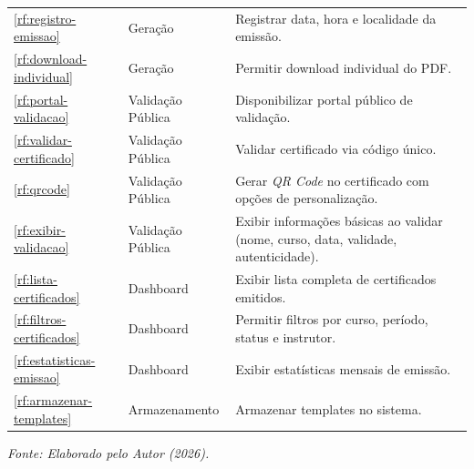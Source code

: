 \begin{longtable}{p{1.2cm} p{3.5cm} p{10.5cm}}
\ref{rf:registro-emissao} & Geração & Registrar data, hora e localidade da emissão. \\
\ref{rf:download-individual} & Geração & Permitir download individual do PDF. \\
\midrule
\ref{rf:portal-validacao} & Validação Pública & Disponibilizar portal público de validação. \\
\ref{rf:validar-certificado} & Validação Pública & Validar certificado via código único. \\
\ref{rf:qrcode} & Validação Pública & Gerar \textit{QR Code} no certificado com opções de personalização. \\
\ref{rf:exibir-validacao} & Validação Pública & Exibir informações básicas ao validar (nome, curso, data, validade, autenticidade). \\
\midrule
\ref{rf:lista-certificados} & Dashboard & Exibir lista completa de certificados emitidos. \\
\ref{rf:filtros-certificados} & Dashboard & Permitir filtros por curso, período, status e instrutor. \\
\ref{rf:estatisticas-emissao} & Dashboard & Exibir estatísticas mensais de emissão. \\
\midrule
\ref{rf:armazenar-templates} & Armazenamento & Armazenar templates no sistema. \\
\bottomrule
\end{longtable}
\noindent\raggedright\small\textit{Fonte: Elaborado pelo Autor (2026).}
\endgroup
\normalsize
\renewcommand{\arraystretch}{1.0}
